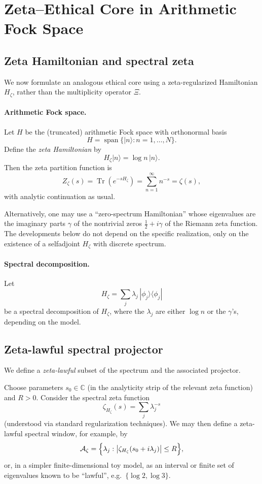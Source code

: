 \documentclass[11pt]{article}
\begin{document}
\section{Zeta--Ethical Core in Arithmetic Fock Space}

\subsection{Zeta Hamiltonian and spectral zeta}

We now formulate an analogous ethical core using a zeta-regularized Hamiltonian $H_\zeta$,
rather than the multiplicity operator $\Xi$.

\paragraph{Arithmetic Fock space.}
Let $H$ be the (truncated) arithmetic Fock space with orthonormal basis
\[
  H = \operatorname{span}\{|n\rangle : n=1,\dots,N\}.
\]
Define the \emph{zeta Hamiltonian} by
\begin{equation}
  H_\zeta |n\rangle = \log n\,|n\rangle.
  \label{eq:Hzeta-logn}
\end{equation}
Then the zeta partition function is
\[
  Z_\zeta(s) = \operatorname{Tr}(e^{-s H_\zeta}) = \sum_{n=1}^\infty n^{-s} = \zeta(s),
\]
with analytic continuation as usual.

Alternatively, one may use a ``zero-spectrum Hamiltonian'' whose eigenvalues are the imaginary parts
$\gamma$ of the nontrivial zeros $\tfrac12 + i\gamma$ of the Riemann zeta function. The developments
below do not depend on the specific realization, only on the existence of a selfadjoint $H_\zeta$
with discrete spectrum.

\paragraph{Spectral decomposition.}
Let
\[
  H_\zeta = \sum_j \lambda_j\,|\phi_j\rangle\langle\phi_j|
\]
be a spectral decomposition of $H_\zeta$, where the $\lambda_j$ are either $\log n$ or
the $\gamma$'s, depending on the model.

\subsection{Zeta-lawful spectral projector}

We define a \emph{zeta-lawful} subset of the spectrum and the associated projector.

Choose parameters $s_0\in\mathbb{C}$ (in the analyticity strip of the relevant zeta function)
and $R>0$. Consider the spectral zeta function
\[
  \zeta_{H_\zeta}(s) = \sum_j \lambda_j^{-s}
\]
(understood via standard regularization techniques). We may then define a zeta-lawful spectral window,
for example, by
\[
  \mathcal{A}_\zeta
  =
  \Bigl\{
    \lambda_j :
    \bigl|\zeta_{H_\zeta}(s_0 + i\lambda_j)\bigr| \le R
  \Bigr\},
\]
or, in a simpler finite-dimensional toy model, as an interval or finite set of eigenvalues
known to be ``lawful'', e.g.\ $\{\log 2,\log 3\}$.
\end{document}
